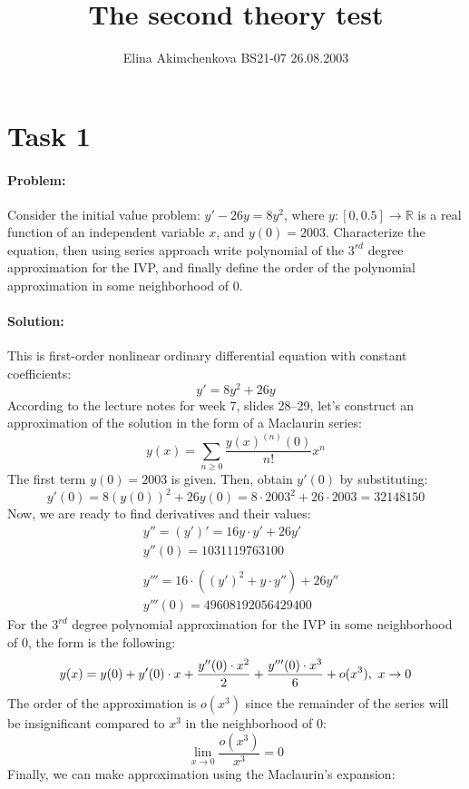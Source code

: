 \documentclass[12pt, oneside]{article}
\title{The second theory test}
\author{Elina Akimchenkova BS21-07 26.08.2003}
\date{}
\begin{document}
\maketitle

\section{Task 1}
\paragraph{Problem:}Consider the initial value problem: \(y' - 26y = 8y^2\), where \(y:[0, 0.5] \xrightarrow{} \mathbb{R}\) is a real function of an independent variable $x$, and $y(0) = 2003$. Characterize the equation, then using series approach write polynomial of the $3^{rd}$ degree approximation for the IVP, and finally define the order of the polynomial approximation in some neighborhood of 0.

\paragraph{Solution:}
This is first-order nonlinear ordinary differential equation with constant coefficients:
\[y'= 8y^2 + 26y\] 
According to the lecture notes for week 7, slides 28–29, let's construct an approximation of the solution in the form of a Maclaurin series:
\[y(x) = \sum_{n \geq 0} \frac{y(x)^{(n)}(0)}{n!}x^n\]
The first term $y(0) = 2003$ is given. Then, obtain $y'(0)$ by substituting:
\[y'(0) = 8(y(0))^2 + 26y(0) = 8 \cdot 2003^2 + 26\cdot 2003 = 32148150\]
Now, we are ready to find derivatives and their values:
\begin{displaymath}
	\begin{split}
		&y'' = (y')' = 16y\cdot y' + 26y' \\
		&y''(0) = 1031119763100 \\
		\\ 
		&y''' = 16\cdot ((y')^2 + y\cdot y'') + 26y''\\
		&y'''(0) = 49608192056429400
	\end{split}
\end{displaymath}
For the $3^{rd}$ degree polynomial approximation for the IVP in some neighborhood of 0, the form is the following:
\[y(x) = y(0) + y'(0) \cdot x + \frac{y''(0) \cdot x^2}{2} + \frac{y'''(0) \cdot x^3}{6} + o(x^3), \ x \rightarrow 0 \\\]
The order of the approximation is $o(x^3)$ since the remainder of the series will be insignificant compared to $x^3$ in the neighborhood of 0:
\[\lim\limits_{x\to 0} \frac{o(x^3)}{x^3}=0\]
Finally, we can make approximation using the Maclaurin's expansion:
\end{document}
